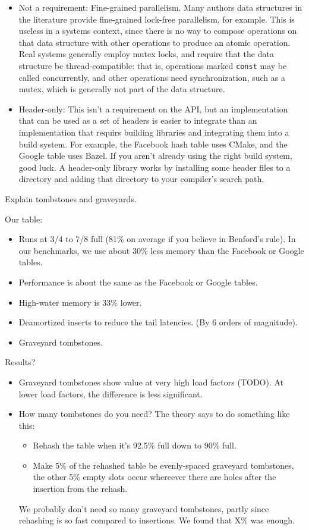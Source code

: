 \documentclass{article}
\begin{document}
\begin{itemize}
\item Not a requirement: Fine-grained parallelism.  Many authors data
  structures in the literature provide fine-grained lock-free
  parallelism, for example.  This is useless in a systems context,
  since there is no way to compose operations on that data structure
  with other operations to produce an atomic operation.  Real systems
  generally employ mutex locks, and require that the data structure be
  thread-compatible: that is, operations marked \texttt{const} may be
  called concurrently, and other operations need synchronization, such
  as a mutex, which is generally not part of the data structure.

\item Header-only: This isn't a requirement on the API, but an
  implementation that can be used as a set of headers is easier to
  integrate than an implementation that requirs building libraries and
  integrating them into a build system.  For example, the Facebook
  hash table uses CMake, and the Google table uses Bazel.  If you
  aren't already using the right build system, good luck.  A
  header-only library works by installing some header files to a
  directory and adding that directory to your compiler's search path.
\end{itemize}

Explain tombstones and graveyards.

Our table:
\begin{itemize}
\item Runs at 3/4 to 7/8 full (81\% on average if you believe in
  Benford's rule).  In our benchmarks, we use about 30\% less memory
  than the Facebook or Google tables.
\item Performance is about the same as the Facebook or Google tables.
\item High-water memory is 33\% lower.
\item Deamortized inserts to reduce the tail latencies.  (By 6 orders
  of magnitude).
\item Graveyard tombstones.
\end{itemize}

Results?
\begin{itemize}
  \item Graveyard tombstones show value at very high load factors (TODO).  At
    lower load factors, the difference is less significant.  
  \item How many tombstones do you need?  The theory says to do something like this:
    \begin{itemize}
    \item Rehash the table when it's 92.5\% full down to 90\% full.
    \item Make 5\% of the rehashed table be evenly-spaced graveyard
      tombstones, the other 5\% empty slots occur whereever there are
      holes after the insertion from the rehash.
    \end{itemize}
    We probably don't need so many graveyard tombstones, partly since
    rehashing is so fast compared to insertions.  We found that X\%
    was enough.
\end{itemize}
\end{document}
